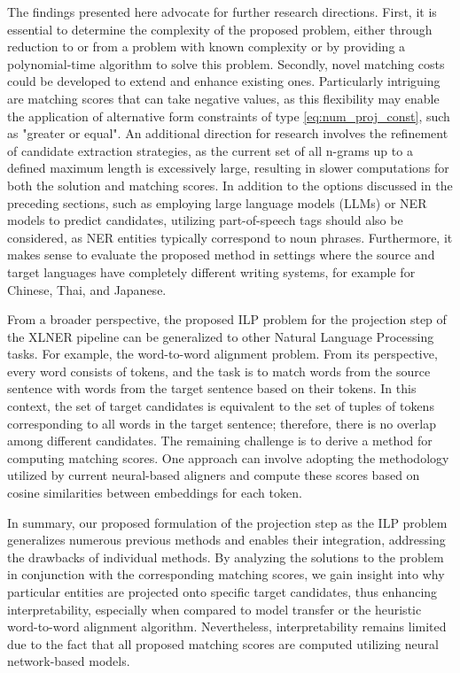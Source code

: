 The findings presented here advocate for further research directions.
First, it is essential to determine the complexity of the proposed problem, either through
reduction to or from a problem with known complexity or by providing a polynomial-time algorithm to solve this problem.
Secondly, novel matching costs could be developed to extend and enhance existing ones. Particularly
intriguing are matching scores that can take negative values, as this flexibility may enable the
application of alternative form constraints of type \eqref{eq:num_proj_const}, such as "greater or equal".
An additional direction for research involves the refinement of candidate extraction strategies,
as the current set of all n-grams up to a defined maximum length is excessively large, resulting
in slower computations for both the solution and matching scores. In addition to the options
discussed in the preceding sections, such as employing large language models (LLMs) or NER models
to predict candidates, utilizing part-of-speech tags should also be considered, as NER entities
typically correspond to noun phrases. Furthermore, it makes sense to evaluate the proposed method in
settings where the source and target languages have completely different writing systems, for example
for Chinese, Thai, and Japanese.

From a broader perspective, the proposed ILP problem for the projection step of the XLNER pipeline
can be generalized to other Natural Language Processing tasks. For example, the word-to-word
alignment problem. From its perspective, every word consists of tokens, and the task is to match words from the source
sentence with words from the target sentence based on their tokens. In this context, the set of target
candidates is equivalent to the set of tuples of tokens corresponding to all words in the target
sentence; therefore, there is no overlap among different candidates. The remaining challenge
is to derive a method for computing matching scores. One approach can involve adopting the methodology
utilized by current neural-based aligners and compute these scores based on cosine similarities
between embeddings for each token.

In summary, our proposed formulation of the projection step as the ILP problem generalizes numerous
previous methods and enables their integration, addressing the drawbacks of individual methods.
By analyzing the solutions to the problem in conjunction with the corresponding matching scores,
we gain insight into why particular entities are projected onto specific target candidates, thus
enhancing interpretability, especially when compared to model transfer or the heuristic word-to-word
alignment algorithm. Nevertheless, interpretability remains limited due to the fact that all
proposed matching scores are computed utilizing neural network-based models.
